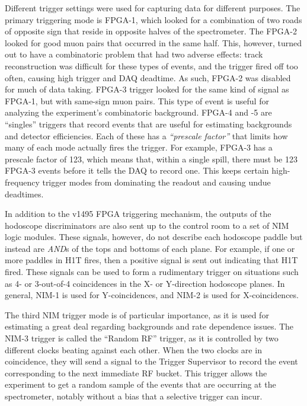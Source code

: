Different trigger settings were used for capturing data for different purposes. The primary triggering mode is FPGA-1, which looked for a combination of two roads of opposite sign that reside in opposite halves of the spectrometer. The FPGA-2 looked for good muon pairs that occurred in the same half. This, however, turned out to have a combinatoric problem that had two adverse effects: track reconstruction was difficult for these types of events, and the trigger fired off too often, causing high trigger and DAQ deadtime. As such, FPGA-2 was disabled for much of data taking. FPGA-3 trigger looked for the same kind of signal as FPGA-1, but with same-sign muon pairs. This type of event is useful for analyzing the experiment's combinatoric background. FPGA-4 and -5 are ``singles'' triggers that record events that are useful for estimating backgrounds and detector efficiencies. Each of these has a \emph{``prescale factor''} that limits how many of each mode actually fires the trigger. For example, FPGA-3 has a prescale factor of 123, which means that, within a single spill, there must be 123 FPGA-3 events before it tells the DAQ to record one. This keeps certain high-frequency trigger modes from dominating the readout and causing undue deadtimes.

In addition to the v1495 FPGA triggering mechanism, the outputs of the hodoscope discriminators are also sent up to the control room to a set of NIM logic modules. These signals, however, do not describe each hodoscope paddle but instead are \emph{AND}s of the tops and bottoms of each plane. For example, if one or more paddles in H1T fires, then a positive signal is sent out indicating that H1T fired. These signals can be used to form a rudimentary trigger on situations such as 4- or 3-out-of-4 coincidences in the X- or Y-direction hodoscope planes. In general, NIM-1 is used for Y-coincidences, and NIM-2 is used for X-coincidences.

The third NIM trigger mode is of particular importance, as it is used for estimating a great deal regarding backgrounds and rate dependence issues. The NIM-3 trigger is called the ``Random RF'' trigger, as it is controlled by two different clocks beating against each other. When the two clocks are in coincidence, they will send a signal to the Trigger Supervisor to record the event corresponding to the next immediate RF bucket. This trigger allows the experiment to get a random sample of the events that are occurring at the spectrometer, notably without a bias that a selective trigger can incur.

